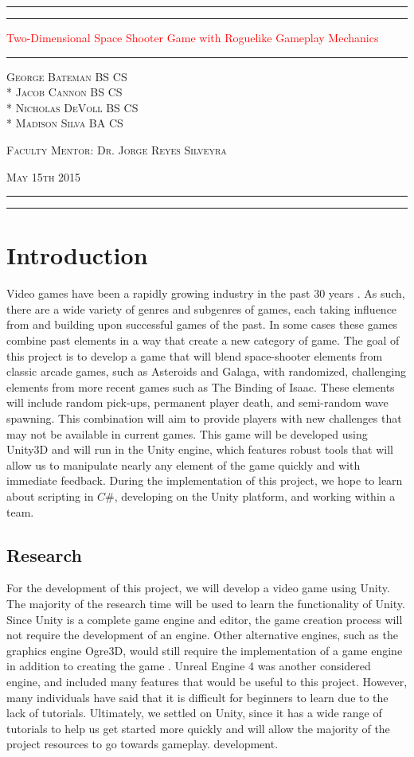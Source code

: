 \documentclass[12pt]{article}       %
\def\hs{\hspace{15pt}}
\newcommand*{\titleAT}{\begingroup %
\newlength{\drop} %
\drop=0.1\textheight %

\rule{\textwidth}{1pt}\par %
\vspace{2pt}\vspace{-\baselineskip} %
\rule{\textwidth}{0.4pt}\par %

\vspace{\drop} %
\centering %
\textcolor{Red}{ %
{\Huge Two-Dimensional Space Shooter Game with Roguelike Gameplay Mechanics}\\[0.5\baselineskip] %
{\Huge }} %

\vspace{0.25\drop} %
\rule{0.3\textwidth}{0.4pt}\par %
\vspace{\drop} %

{\Large \textsc{George Bateman BS CS \\* Jacob Cannon BS CS \\* Nicholas DeVoll BS CS \\* \vspace{3pt} Madison Silva BA CS}}\par %

\vfill %

{\large \textsc{Faculty Mentor: Dr. Jorge Reyes Silveyra}}\par 

{\large \textsc{May 15th 2015}}\par

\vspace*{\drop} %

\rule{\textwidth}{0.4pt}\par %
\vspace{2pt}\vspace{-\baselineskip} %
\rule{\textwidth}{1pt}\par %

\endgroup}
\begin{document}
\begin{titlepage}
\thispagestyle{empty}
\titleAT
\end{titlepage}

\newpage
\begin{titlepage}
\thispagestyle{empty}
\tableofcontents
\end{titlepage}

\begin{titlepage}
\thispagestyle{empty}
\listoffigures
\end{titlepage}


\newpage

\section{Introduction} %
\label{sec:intro}

\hs Video games have been a rapidly growing industry in the past 30 years \cite{History}. As such, there are a wide variety of genres and subgenres of games, each taking influence from and building upon successful games of the past. In some cases these games combine past elements in a way that create a new category of game. The goal of this project is to develop a game that will blend space-shooter elements from classic arcade games, such as Asteroids and Galaga, with randomized, challenging elements from more recent games such as The Binding of Isaac. These elements will include random pick-ups, permanent player death, and semi-random wave spawning. This combination will aim to provide players with new challenges that may not be available in current games. This game will be developed using Unity3D and will run in the Unity engine, which features robust tools that will allow us to manipulate nearly any element of the game quickly and with immediate feedback. During the implementation of this project, we hope to learn about scripting in $C\#$, developing on the Unity platform, and working within a team.

\subsection{Research}
	For the development of this project, we will develop a video game using Unity. The majority of the research time will be used to learn the functionality of Unity. Since Unity is a complete game engine and editor, the game creation process will not require the development of an engine. Other alternative engines, such as the graphics engine Ogre3D, would still require the implementation of a game engine in addition to creating the game \cite{Ogre}. Unreal Engine 4 was another considered engine, and included many features that would be useful to this project. However, many individuals have said that it is difficult for beginners to learn due to the lack of tutorials. Ultimately, we settled on Unity, since it has a wide range of tutorials to help us get started more quickly and will allow the majority of the project resources to go towards gameplay. development.
\end{document}
